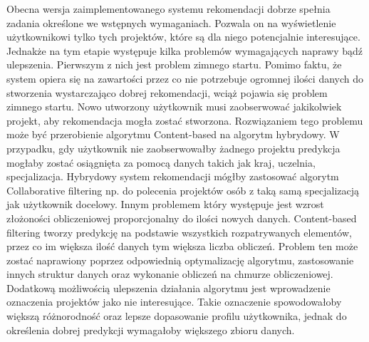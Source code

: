 Obecna wersja zaimplementowanego systemu rekomendacji dobrze spełnia zadania określone we wstępnych wymaganiach. Pozwala on na wyświetlenie użytkownikowi tylko tych projektów, które są dla niego potencjalnie interesujące. Jednakże na tym etapie występuje kilka problemów wymagających naprawy bądź ulepszenia. Pierwszym z nich jest problem zimnego startu. Pomimo faktu, że system opiera się na zawartości przez co nie potrzebuje ogromnej ilości danych do stworzenia wystarczająco dobrej rekomendacji, wciąż pojawia się problem zimnego startu. Nowo utworzony użytkownik musi zaobserwować jakikolwiek projekt, aby rekomendacja mogła zostać stworzona. Rozwiązaniem tego problemu może być przerobienie algorytmu Content-based na algorytm hybrydowy. W przypadku, gdy użytkownik nie zaobserwowałby żadnego projektu predykcja mogłaby zostać osiągnięta za pomocą danych takich jak kraj, uczelnia, specjalizacja. Hybrydowy system rekomendacji mógłby zastosować algorytm Collaborative filtering np. do polecenia projektów osób z taką samą specjalizacją jak użytkownik docelowy. Innym problemem który występuje jest wzrost złożoności obliczeniowej proporcjonalny do ilości nowych danych. Content-based filtering tworzy predykcję na podstawie wszystkich rozpatrywanych elementów, przez co im większa ilość danych tym większa liczba obliczeń. Problem ten może zostać naprawiony poprzez odpowiednią optymalizację algorytmu, zastosowanie innych struktur danych oraz wykonanie obliczeń na chmurze obliczeniowej. Dodatkową możliwością ulepszenia działania algorytmu jest wprowadzenie oznaczenia projektów jako nie interesujące. Takie oznaczenie spowodowałoby większą różnorodność oraz lepsze dopasowanie profilu użytkownika, jednak do określenia dobrej predykcji wymagałoby większego zbioru danych.